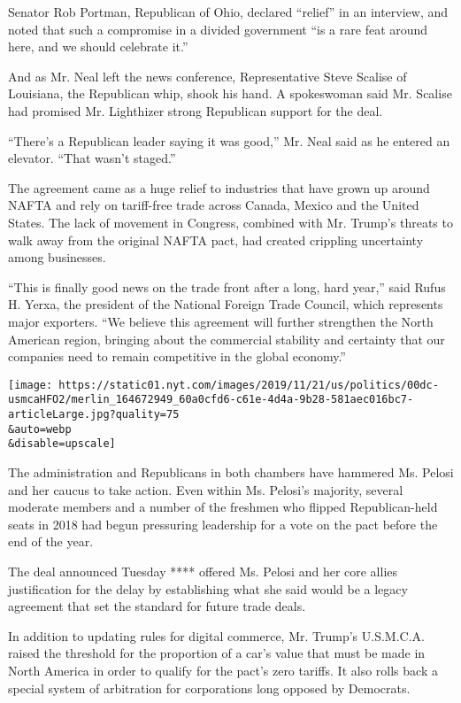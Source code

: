 Senator Rob Portman, Republican of Ohio, declared ``relief'' in an
interview, and noted that such a compromise in a divided government ``is
a rare feat around here, and we should celebrate it.''

And as Mr. Neal left the news conference, Representative Steve Scalise
of Louisiana, the Republican whip, shook his hand. A spokeswoman said
Mr. Scalise had promised Mr. Lighthizer strong Republican support for
the deal.

``There's a Republican leader saying it was good,'' Mr. Neal said as he
entered an elevator. ``That wasn't staged.''

The agreement came as a huge relief to industries that have grown up
around NAFTA and rely on tariff-free trade across Canada, Mexico and the
United States. The lack of movement in Congress, combined with Mr.
Trump's threats to walk away from the original NAFTA pact, had created
crippling uncertainty among businesses.

``This is finally good news on the trade front after a long, hard
year,'' said Rufus H. Yerxa, the president of the National Foreign Trade
Council, which represents major exporters. ``We believe this agreement
will further strengthen the North American region, bringing about the
commercial stability and certainty that our companies need to remain
competitive in the global economy.''

\texttt{[image: https://static01.nyt.com/images/2019/11/21/us/politics/00dc-usmcaHFO2/merlin\_164672949\_60a0cfd6-c61e-4d4a-9b28-581aec016bc7-articleLarge.jpg?quality=75\\\&auto=webp\\\&disable=upscale]}

The administration and Republicans in both chambers have hammered Ms.
Pelosi and her caucus to take action. Even within Ms. Pelosi's majority,
several moderate members and a number of the freshmen who flipped
Republican-held seats in 2018 had begun pressuring leadership for a vote
on the pact before the end of the year.

The deal announced Tuesday **** offered Ms. Pelosi and her core allies
justification for the delay by establishing what she said would be a
legacy agreement that set the standard for future trade deals.

In addition to updating rules for digital commerce, Mr. Trump's
U.S.M.C.A. raised the threshold for the proportion of a car's value that
must be made in North America in order to qualify for the pact's zero
tariffs. It also rolls back a special system of arbitration for
corporations long opposed by Democrats.

